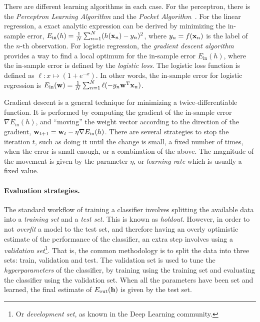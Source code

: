 There are different learning algorithms in each case. 
%
For the perceptron, there is the {\em Perceptron Learning Algorithm} and the
{\em Pocket Algorithm}~\cite{Abu-Mostafa:2012:LD:2207825}. 
%
For the linear regression, a exact analytic expression can be derived by
minimizing the in-sample error, $E_{\text{in}}(h) = \frac{1}{N} \sum_{n=1}^{N}
(h(\boldsymbol{\mathbf{x}}_n) - y_n)^2$, where $y_n = f(\boldsymbol{\mathbf{x}}_n)$ is the label of the $n$-th
observation.
%
For logistic regression, the {\em gradient descent algorithm} provides a way to
find a local optimum for the in-sample error $E_{\text{in}}(h)$, where the
in-sample error is defined by the {\em logistic loss}.
%
The logistic loss function is defined as $\ell: x \mapsto (1 +
\mathit{e}^{-x})$.
% 
In other words, the in-sample error for logistic regression is
$E_{\text{in}}(\boldsymbol{\mathbf{w}}) = \frac{1}{N}\sum_{n=1}^N
\ell(-y_n\boldsymbol{\mathbf{w}}^\text{T}\boldsymbol{\mathbf{x}}_n)$.




Gradient descent is a general technique for minimizing a twice-differentiable
function. 
%
It is performed by computing the gradient of the in-sample error $\nabla
E_{\text{in}}(h)$, and ``moving'' the weight vector according to the direction
of the gradient, $\boldsymbol{\mathbf{w}}_{t+1} = \boldsymbol{\mathbf{w}}_t - \eta\nabla E_{\text{in}}(h)$.
%
There are several strategies to stop the iteration $t$, such as doing it until
the change is small, a fixed number of times, when the error is small enough, or
a combination of the above.
%
The magnitude of the movement is given by the parameter $\eta$, or {\em learning
rate} which is usually a fixed value.

\paragraph{Evaluation strategies.}

The standard workflow of training a classifier involves splitting the available
data into a {\em training set} and a {\em test set}. 
%
This is known as {\em holdout}.
%
However, in order to not {\em overfit} a model to the test set, and therefore
having an overly optimistic estimate of the performance of the classifier, an
extra step involves using a {\em validation set}\footnote{Or {\em development
set}, as known in the Deep Learning community.}.
%
That is, the common methodology is to split the data into three sets: train,
validation and test.
%
The validation set is used to tune the {\em hyperparameters} of the classifier,
by training using the training set and evaluating the classifier using the
validation set.
%
When all the parameters have been set and learned, the final estimate of
$E_{\text{out}}(\boldsymbol{\mathbf{h}})$ is given by the test set.

